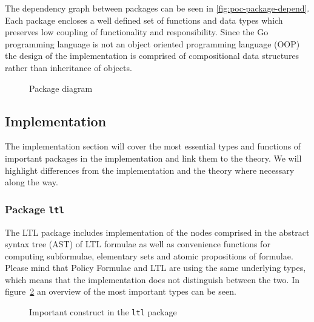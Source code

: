 The dependency graph between packages can be seen in \autoref{fig:poc-package-depend}. Each package encloses a well defined set of functions and data types which preserves low coupling of functionality and responsibility. Since the Go programming language is not an object oriented programming language (OOP) the design of the implementation is comprised of compositional data structures rather than inheritance of objects.

\begin{figure}[!ht]
    \centering
    
    \caption{Package diagram}
    \label{fig:poc-package-depend}
\end{figure}

\subsection{Implementation}
The implementation section will cover the most essential types and functions of important packages in the implementation and link them to the theory. We will highlight differences from the implementation and the theory where necessary along the way.

\subsubsection{Package \texttt{ltl}}
The LTL package includes implementation of the nodes comprised in the abstract syntax tree (AST) of LTL formulae as well as convenience functions for computing subformulae, elementary sets and atomic propositions of formulae. Please mind that Policy Formulae and LTL are using the same underlying types, which means that the implementation does not distinguish between the two. In figure~\ref{fig:poc-ltl-package} an overview of the most important types can be seen.
\begin{figure}
    \caption{Important construct in the \texttt{ltl} package}
    \label{fig:poc-ltl-package}
\end{figure}

